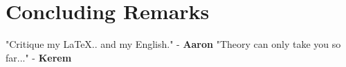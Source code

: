 \setcounter{chapter}{11}
\chapter{Concluding Remarks}
\large
"Critique my \LaTeX.. and my English." - \textbf{Aaron}
"Theory can only take you so far..." - \textbf{Kerem}

